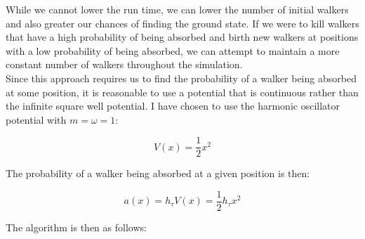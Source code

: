 \documentclass[reqno]{amsart}
\numberwithin{equation}{section}
\numberwithin{figure}{section}
\begin{document}
While we cannot lower the run time, we can lower the number of initial walkers and also greater our chances of finding the ground state. If we were to kill walkers that have a high probability of being absorbed and birth new walkers at positions with a low probability of being absorbed, we can attempt to maintain a more constant number of walkers throughout the simulation. \\

Since this approach requires us to find the probability of a walker being absorbed at some position, it is reasonable to use a potential that is continuous rather than the infinite square well potential. I have chosen to use the harmonic oscillator potential with $m = \omega = 1$:

\begin{equation}
    V(x) = \frac{1}{2}x^2
\end{equation}

The probability of a walker being absorbed at a given position is then:

\begin{equation}
    a(x) = h_\tau V(x) = \frac{1}{2}h_\tau x^2
\end{equation}

The algorithm is then as follows:
\end{document}
